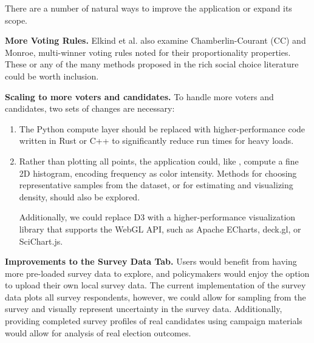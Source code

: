 
There are a number of natural ways to improve the application or expand its scope.

\textbf{More Voting Rules.}
Elkind et al. \cite{elkind} also examine
Chamberlin-Courant (CC) and Monroe,
multi-winner voting rules noted for their proportionality properties.
These or any of the many methods proposed in the rich social choice
literature could be worth inclusion.


\textbf{Scaling to more voters and candidates.}
To handle more voters and candidates, two sets of changes are necessary:
\begin{enumerate}
  \item
The Python compute layer should be replaced with higher-performance
code written in Rust or C++ to significantly reduce run times for heavy loads.

\item
  Rather than plotting all points, the application could, like \cite{elkind},
  compute a fine 2D histogram, encoding frequency as color intensity.
  Methods for choosing representative samples from the dataset,
  or for estimating and visualizing density, should also be explored.

  Additionally, we could replace D3
  with a higher-performance visualization library
  that supports the WebGL API,
  such as Apache ECharts, deck.gl, or SciChart.js.

\end{enumerate}

\textbf{Improvements to the Survey Data Tab.}
Users would benefit from having more pre-loaded survey data to explore, and policymakers would enjoy the option to upload their own local survey data. 
The current implementation of the survey data
plots all survey respondents, however, we could allow for sampling
from the survey and visually represent uncertainty in the survey data. 
Additionally, providing completed survey profiles of real candidates
using campaign materials would allow for analysis of real election outcomes.

